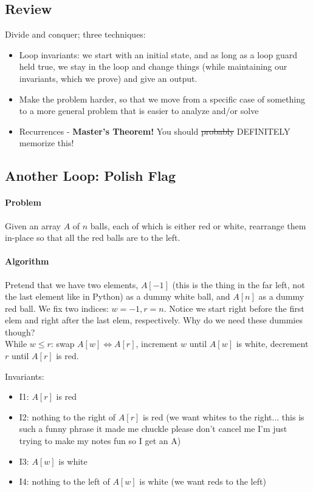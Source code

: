 \documentclass[11pt]{article}
\begin{document}
\subsection{Review}
Divide and conquer; three techniques:
\begin{itemize}
    \item Loop invariants: we start with an initial state, and as long as a loop guard held true,
        we stay in the loop and change things (while maintaining our invariants, which we prove)
        and give an output.
    \item Make the problem harder, so that we move from a specific case of something to a more
        general problem that is easier to analyze and/or solve
    \item Recurrences - \textbf{Master's Theorem!} You should \sout{probably} DEFINITELY memorize 
        this!
\end{itemize}

\subsection{Another Loop: Polish Flag}

\paragraph{Problem} Given an array $A$ of $n$ balls, each of which is either red or white,
rearrange them in-place so that all the red balls are to the left.

\paragraph{Algorithm} Pretend that we have two elements, $A[-1]$ (this is the thing in the far left,
not the last element like in Python) as a dummy white ball, and $A[n]$ as a dummy red ball. We fix
two indices: $w=-1, r=n$. Notice we start right before the first elem and right after the last elem,
respectively. Why do we need these dummies though? \\
While $w \leq r$: swap $A[w] \iff A[r]$, increment $w$ until $A[w]$ is white, decrement $r$ until
$A[r]$ is red.

Invariants:
\begin{itemize}
    \item I1: $A[r]$ is red
    \item I2: nothing to the right of $A[r]$ is red (we want whites to the right... this is such
        a funny phrase it made me chuckle please don't cancel me I'm just trying to make my notes
        fun so I get an A)
    \item I3: $A[w]$ is white
    \item I4: nothing to the left of $A[w]$ is white (we want reds to the left)
\end{itemize}
\end{document}

